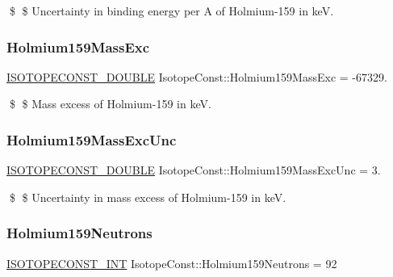 \$ \$ Uncertainty in binding energy per A of Holmium-\/159 in keV. \mbox{\label{group___isotope_const-_holmium-_ho159_ga93fe5c9cfabd90f1652f6d889e9395c1}} 
\subsubsection{\texorpdfstring{Holmium159\+Mass\+Exc}{Holmium159MassExc}}
{\footnotesize\ttfamily \mbox{\hyperlink{group___isotope_const-_macros_ga8f45a7272ce02c0b4c65c44636ed719a}{I\+S\+O\+T\+O\+P\+E\+C\+O\+N\+S\+T\+\_\+\+D\+O\+U\+B\+LE}} Isotope\+Const\+::\+Holmium159\+Mass\+Exc = -\/67329.}

\$ \$ Mass excess of Holmium-\/159 in keV. \mbox{\label{group___isotope_const-_holmium-_ho159_gac9e372400f125371833902b8a113af7a}} 
\subsubsection{\texorpdfstring{Holmium159\+Mass\+Exc\+Unc}{Holmium159MassExcUnc}}
{\footnotesize\ttfamily \mbox{\hyperlink{group___isotope_const-_macros_ga8f45a7272ce02c0b4c65c44636ed719a}{I\+S\+O\+T\+O\+P\+E\+C\+O\+N\+S\+T\+\_\+\+D\+O\+U\+B\+LE}} Isotope\+Const\+::\+Holmium159\+Mass\+Exc\+Unc = 3.}

\$ \$ Uncertainty in mass excess of Holmium-\/159 in keV. \mbox{\label{group___isotope_const-_holmium-_ho159_ga36d30646944d8d12933f02132bad0eac}} 
\subsubsection{\texorpdfstring{Holmium159\+Neutrons}{Holmium159Neutrons}}
{\footnotesize\ttfamily \mbox{\hyperlink{group___isotope_const-_macros_ga5f18360b3e99483a35c32d789e62621c}{I\+S\+O\+T\+O\+P\+E\+C\+O\+N\+S\+T\+\_\+\+I\+NT}} Isotope\+Const\+::\+Holmium159\+Neutrons = 92}

